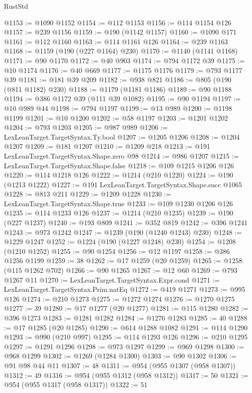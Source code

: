 \begin{lexlean}{RustStd}
\begin{coremodule}
{\begin{coremodule}
{{{{{{{{{{{{{{{{{{{{{{{{{{{{{{{{{{{{{{{{{{{{{{{{{{@1153 := @1090 @1152
@1154 := @112 @1153
@1156 := @114 @1154 @126
@1157 := @239 @1156
@1159 := @190 (@1142 @1157)
@1160 := @1090 @171
@1161 := @112 @1160
@1163 := @114 @1161 @126
@1164 := @239 @1163
@1168 := @1159 (@190 (@227 @1164) @230)
@1170 := @1140 (@1141 @1168)
@1171 := @90 @1170
@1172 := @40 @903
@1174 := @794 @1172 @39
@1175 := @10 @1174
@1176 := @40 @669
@1177 := @1175 @1176
@1179 := @793 @1177 @39
@1181 := @181 @39 @209
@1182 := @938 @821
@1186 := @805 (@190 (@811 @1182) @230)
@1188 := @1179 (@1181 @1186)
@1189 := @90 @1188
@1194 := @386 @1172 @39 (@111 @39 @1082)
@1195 := @90 @1194
@1197 := @10 @989 @44
@1198 := @794 @1197
@1199 := @13 @989
@1200 := @1198 @1199
@1201 := @10 @1200
@1202 := @58 @1197
@1203 := @1201 @1202
@1204 := @793 @1203
@1205 := @987 @989
@1206 := LexLeanTarget.TargetSyntax.Ty.bool
@1207 := @1205 @1206
@1208 := @1204 @1207
@1209 := @181 @1207
@1210 := @1209 @218
@1213 := @191 LexLeanTarget.TargetSyntax.Shape.zero @98
@1214 := @986 @1207
@1215 := LexLeanTarget.TargetSyntax.Shape.false
@1218 := @109 @1215 @1206 @126
@1220 := @114 @1218 @126
@1222 := @1214 (@210 @1220)
@1224 := @190 (@1213 @1222)
@1227 := @191 LexLeanTarget.TargetSyntax.Shape.succ @1065
@1228 := @813 @211
@1229 := @1209 @1228
@1230 := LexLeanTarget.TargetSyntax.Shape.true
@1233 := @109 @1230 @1206 @126
@1235 := @114 @1233 @126
@1237 := @1214 (@210 @1235)
@1239 := @190 (@227 @1237)
@1240 := @193 @809
@1241 := @352 @819
@1242 := @396 @1241
@1243 := @973 @1242
@1247 := @1239 (@190 (@1240 @1243) @230)
@1248 := @1229 @1247
@1252 := @1224 (@190 (@1227 @1248) @230)
@1254 := @1208 (@1210 @1252)
@1255 := @90 @1254
@1256 := @12 @1197
@1258 := @386 @1256 @1199
@1259 := 38
@1262 := @17 @1259 (@20 @1259)
@1265 := @1258 (@115 @1262 @702)
@1266 := @90 @1265
@1267 := @12 @60
@1269 := @793 @1267 @11
@1270 := LexLeanTarget.TargetSyntax.Expr.cond
@1271 := LexLeanTarget.TargetSyntax.Prim.natEq
@1272 := @419 @1271
@1273 := @995 @126
@1274 := @210 @1273
@1275 := @1272 @1274
@1276 := @1270 @1275
@1277 := 39
@1280 := @17 @1277 (@20 @1277)
@1281 := @115 @1280
@1282 := @396 @1273
@1283 := @1281 @1282
@1284 := @1276 @1283
@1285 := 40
@1288 := @17 @1285 (@20 @1285)
@1290 := @614 @1288 @1082
@1291 := @114 @1290
@1293 := @990 (@210 @997)
@1295 := @114 @1293 @126
@1296 := @210 @1295
@1297 := @1291 @1296
@1298 := @973 @1297
@1299 := @969 @1298
@1300 := @968 @1299
@1302 := @1269 (@1284 @1300)
@1303 := @90 @1302
@1306 := @91 @98 @44 @11
@1307 := 48
@1311 := @954 (@955 @1307 (@958 @1307))
@1312 := 49
@1316 := @954 (@955 @1312 (@958 @1312))
@1317 := 50
@1321 := @954 (@955 @1317 (@958 @1317))
@1322 := 51
}}}}}}}}}}}}}}}}}}}}}}}}}}}}}}}}}}}}}}}}}}}}}}}}}}
\end{coremodule}}
\end{coremodule}
\end{lexlean}
